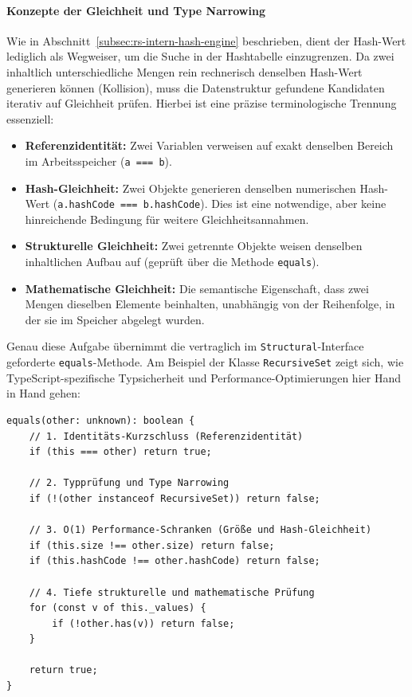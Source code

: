 \paragraph{Konzepte der Gleichheit und Type Narrowing}
\label{subsec:rs-intern-areequal}

Wie in Abschnitt~\ref{subsec:rs-intern-hash-engine} beschrieben, dient der Hash-Wert lediglich als Wegweiser, um die Suche in der Hashtabelle einzugrenzen. Da zwei inhaltlich unterschiedliche Mengen rein rechnerisch denselben Hash-Wert generieren können (Kollision), muss die Datenstruktur gefundene Kandidaten iterativ auf Gleichheit prüfen. Hierbei ist eine präzise terminologische Trennung essenziell:

\begin{itemize}
    \item \textbf{Referenzidentität:} Zwei Variablen verweisen auf exakt denselben Bereich im Arbeitsspeicher (\texttt{a === b}).
    \item \textbf{Hash-Gleichheit:} Zwei Objekte generieren denselben numerischen Hash-Wert (\texttt{a.hashCode === b.hashCode}). Dies ist eine notwendige, aber keine hinreichende Bedingung für weitere Gleichheitsannahmen.
    \item \textbf{Strukturelle Gleichheit:} Zwei getrennte Objekte weisen denselben inhaltlichen Aufbau auf (geprüft über die Methode \texttt{equals}).
    \item \textbf{Mathematische Gleichheit:} Die semantische Eigenschaft, dass zwei Mengen dieselben Elemente beinhalten, unabhängig von der Reihenfolge, in der sie im Speicher abgelegt wurden.
\end{itemize}

Genau diese Aufgabe übernimmt die vertraglich im \texttt{Structural}-Interface geforderte \texttt{equals}-Methode. Am Beispiel der Klasse \texttt{RecursiveSet} zeigt sich, wie TypeScript-spezifische Typsicherheit und Performance-Optimierungen hier Hand in Hand gehen:

\begin{listing}[ht]
    \caption{Die \texttt{equals}-Methode von \texttt{RecursiveSet}}
    \label{lst:rs-equals-method}
    \begin{verbatim}
equals(other: unknown): boolean {
    // 1. Identitäts-Kurzschluss (Referenzidentität)
    if (this === other) return true;
    
    // 2. Typprüfung und Type Narrowing
    if (!(other instanceof RecursiveSet)) return false;
    
    // 3. O(1) Performance-Schranken (Größe und Hash-Gleichheit)
    if (this.size !== other.size) return false;
    if (this.hashCode !== other.hashCode) return false;
    
    // 4. Tiefe strukturelle und mathematische Prüfung
    for (const v of this._values) { 
        if (!other.has(v)) return false; 
    }
    
    return true;
}
    \end{verbatim}
\end{listing}

